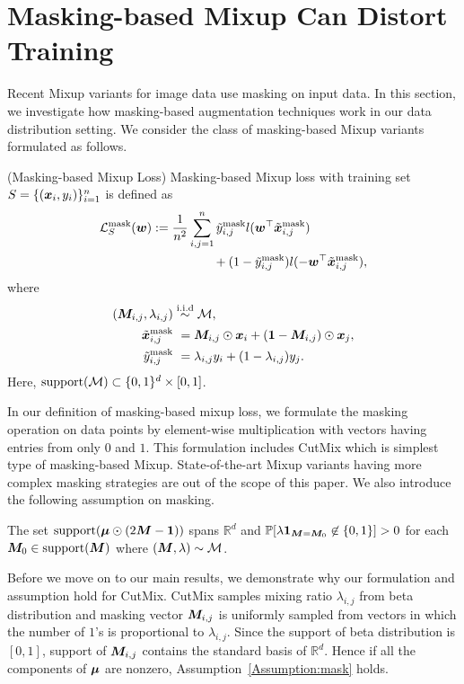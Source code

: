 \vspace*{-5pt}
\section{Masking-based Mixup Can Distort Training}\label{section:mask}
Recent Mixup variants for image data \citep{yun2019cutmix, kim2020puzzle, kim2021co, liu2022automix} use masking on input data. In this section, we investigate how masking-based augmentation techniques work in our data distribution setting. We consider the class of masking-based Mixup variants formulated as follows.
\begin{definition}(Masking-based Mixup Loss) Masking-based Mixup loss with training set $S = \{ ({\bm{x}}_i, y_i)\}_{i=1}^n$ is defined as
\vspace{-10pt}
\begin{align*}
   \lossmask(\vw):= \frac{1}{n^2} &\sum_{i,j=1}^n \tilde{y}_{i,j}^\mathrm{mask} l(\vw^\top \tilde{\vx}_{i,j}^\mathrm{mask})\\
   &\qquad+ (1-\tilde{y}_{i,j}^\mathrm{mask}) l(-\vw^\top \tilde{\vx}_{i,j}^\mathrm{mask}) ,
   \vspace{-10pt}
\end{align*}
where
\vspace{-10pt}
\begin{align*}
   ({\bm{M}}_{i,j},\lambda_{i,j}) &\overset{\mathrm{i.i.d}}{\sim} \mathcal{M},\\
   \tilde{{\bm{x}}}_{i,j}^\mathrm{mask} &~= {\bm{M}}_{i,j} \odot  {\bm{x}}_i  + ({\bm{1}} -{\bm{M}}_{i,j}) \odot {\bm{x}}_j, \\
   \tilde{y}_{i,j}^\mathrm{mask} &~= \lambda_{i,j} y_i  + (1-\lambda_{i,j})y_j.
\end{align*}
Here, $\mathrm{support} (\mathcal{M}) \subset \{0,1\}^d \times[0,1]$. 
\end{definition}
\vspace{-10pt}
In our definition of masking-based mixup loss, we formulate the masking operation on data points by element-wise multiplication with vectors having entries from only $0$ and $1$. This formulation includes CutMix \citep{yun2019cutmix} which is simplest type of masking-based Mixup. State-of-the-art Mixup variants having more complex masking strategies \citep{kim2020puzzle, kim2021co, liu2022automix} are out of the scope of this paper. We also introduce the following assumption on masking.
\begin{assumption} \label{Assumption:mask}
The set $\mathrm{support}({\bm{\mu}} \odot (2{\bm{M}}-{\bm{1}}))$ spans $\mathbb{R}^d$ and $\mathbb{P}[\lambda {\bm{1}}_{{\bm{M}} = {\bm{M}}_0} \not \in \{0,1\}]>0$ for each ${\bm{M}}_0 \in \mathrm{support}({\bm{M}})$ where $({\bm{M}}, \lambda) \sim \mathcal{M}$.
\end{assumption}
\vspace{-5pt}
Before we move on to our main results, we demonstrate why our formulation and assumption hold for CutMix. CutMix samples mixing ratio $\lambda_{i,j}$ from beta distribution and masking vector ${\bm{M}}_{i,j}$ is uniformly sampled from vectors in which the number of $1$'s is proportional to $\lambda_{i,j}$. 
Since the support of beta distribution is $[0,1]$, support of ${\bm{M}}_{i,j}$ contains the standard basis of $\mathbb{R}^d$. Hence if all the components of ${\bm{\mu}}$ are nonzero, Assumption~\ref{Assumption:mask} holds.

